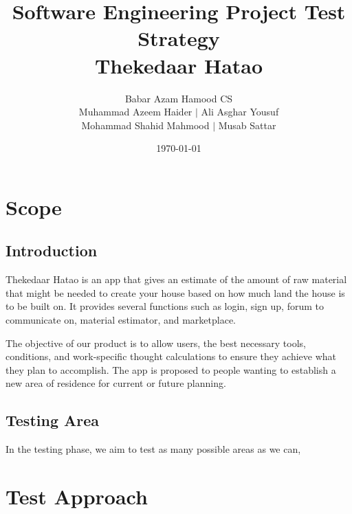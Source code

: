 \documentclass[title page]{article}
\title{Software Engineering Project Test Strategy\\
        Thekedaar Hatao}
\author{Babar Azam Hamood CS\\
        Muhammad Azeem Haider $\mid$ Ali Asghar Yousuf \\
        Mohammad Shahid Mahmood $\mid$ Musab Sattar}
\date{\today}
\begin{document}
\clearpage\maketitle
\setcounter{page}{1}
\tableofcontents


\newpage
{} %


\maketitle

\section{Scope}
\subsection{Introduction}

Thekedaar Hatao is an app that gives an estimate of the amount of raw material that might be needed to create your house based on how much land the house is to be built on. It provides several functions such as login, sign up, forum to communicate on, material estimator, and marketplace.

The objective of our product is to allow users, the best necessary tools, conditions, and work-specific thought calculations to ensure they achieve what they plan to accomplish. The app is proposed to people wanting to establish a new area of residence for current or future planning. 

\subsection{Testing Area}
In the testing phase, we aim to test as many possible areas as we can, 



\section{Test Approach}
\end{document}

